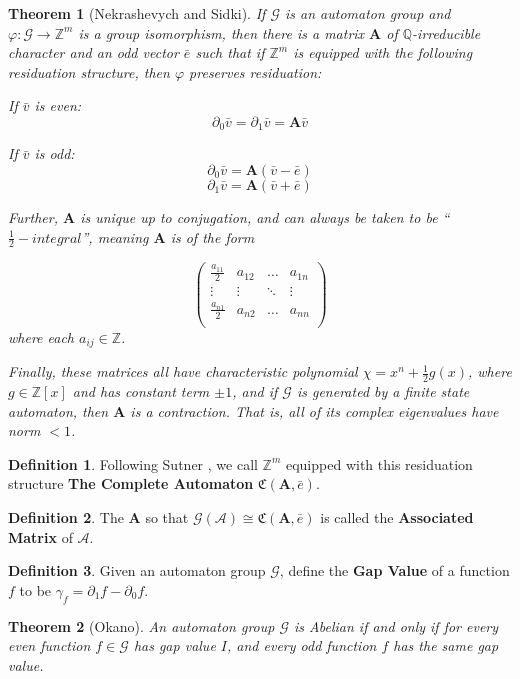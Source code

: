 \documentclass{article}
\newcommand{\A}{\mathcal{A}}
\newcommand{\G}{\mathcal{G}}
\newcommand{\C}{\mathfrak{C}(\Am,\e)}
\newcommand{\Z}{\mathbb{Z}}
\newcommand{\Q}{\mathbb{Q}}
\newcommand{\2}{\textbf{2}}
\newcommand{\Am}{\textbf{A}}
\newcommand{\del}{\partial}
\newcommand{\vv}{\bar{v}}
\newcommand{\e}{\bar{e}}
\newtheorem{thm}{Theorem}
\theoremstyle{definition}
\newtheorem{defn}{Definition}
\begin{document}
\begin{thm}[Nekrashevych and Sidki]
  If $\G$ is an automaton group and $\varphi : \G \to \Z^m$ is a group 
  isomorphism, then there is a matrix $\Am$ of $\Q$-irreducible character
  and an odd vector $\e$ such that if $\Z^m$ is equipped with the following 
  residuation structure, then $\varphi$ preserves residuation:

  If $\vv$ is even:
  \[ \del_0 \vv = \del_1 \vv = \Am \vv \]

  If $\vv$ is odd:
  \[ \del_0 \vv = \Am (\vv - \e) \]
  \[ \del_1 \vv = \Am (\vv + \e) \]

  Further, $\Am$ is unique up to conjugation, and can always be taken to be 
  ``$\frac{1}{2}-integral$'', meaning $\Am$ is of the form 

  \[
  \begin{pmatrix}
    \frac{a_{11}}{2} & a_{12} & \dots  & a_{1n}\\
    \vdots           & \vdots & \ddots & \vdots\\
    \frac{a_{n1}}{2} & a_{n2} & \dots  & a_{nn}\\
  \end{pmatrix}
  \]
  where each $a_{ij} \in \Z$.

  Finally, these matrices all have characteristic polynomial
  $\chi = x^n + \frac{1}{2}g(x)$, where $g \in \Z[x]$ and has constant term 
  $\pm 1$, and if $\G$ is generated by a finite state automaton, then 
  $\Am$ is a contraction. That is, all of its complex eigenvalues have
  norm $<1$.
\end{thm}

\begin{defn}
  Following Sutner \cite{Sutner18:abelian_automata}, we call $\Z^m$ equipped
  with this residuation structure \textbf{The Complete Automaton} $\C$. 
\end{defn}

\begin{defn}
  The $\Am$ so that $\G(\A) \cong \C$ is called the 
  \textbf{Associated Matrix} of $\A$.
\end{defn}

\begin{defn}
  Given an automaton group $\G$, define the \textbf{Gap Value} of a function 
  $f$ to be $\gamma_f = \del_1 f - \del_0 f$.
\end{defn}

\begin{thm}[Okano]
  An automaton group $\G$ is Abelian if and only if for every even function
  $f \in \G$ has gap value $I$, and every odd function $f$ has the same 
  gap value.
\end{thm}
\end{document}
